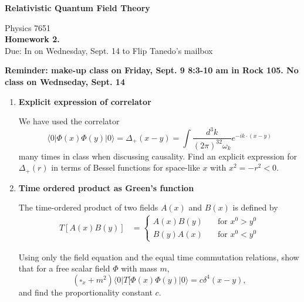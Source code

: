 \documentclass[12pt]{article}
\begin{document}
\vspace*{-1cm}
\begin{center}
{\LARGE \bf Relativistic Quantum Field Theory}

\vspace*{0.5cm}
{\Large Physics 7651} \\
\vspace*{0.5cm}
{\Large {\bf Homework 2. }\\
\vspace*{0.5cm}
Due: In on Wednesday, Sept. 14 to Flip Tanedo's mailbox}
\end{center}

{\bf Reminder: make-up class on Friday, Sept. 9 8:3-10 am in Rock 105. No class on Wednseday, Sept. 14}


\begin{enumerate}

\item  {\bf Explicit expression of correlator} 

We have used the correlator 
\[ \langle 0| \Phi (x) \Phi (y) |0\rangle = \Delta_+(x-y)= \int \frac{d^3 k}{(2\pi )^32 \omega_k }e^{-i k\cdot (x-y)} \]
many times in class when discussing causality. Find an explicit expression for $\Delta_+ (r)$ in terms of Bessel functions for space-like $x$ with $x^2=-r^2<0$.  


\vspace*{0.5cm}

\item {\bf Time ordered product as Green's function}

The time-ordered product of two fields $A(x)$ and $B(x)$ is defined by
\begin{align*}
	T\left[A(x)B(y)\right] &= \left\{
		\begin{array}{ll}
			A(x)B(y) & \quad \text{for } x^0 > y^0\\
			B(y)A(x) & \quad \text{for } x^0 < y^0
		\end{array}
	\right.
\end{align*}

Using only the field equation and the equal time commutation relations, show that for a free scalar field $\Phi$ with mass $m$,
\[ (\square_x +m^2) \langle 0|T[ \Phi (x)\Phi(y)|0\rangle = c \delta^4 (x-y) ,\]
and find the proportionality constant $c$.


\end{enumerate}
\end{document}
